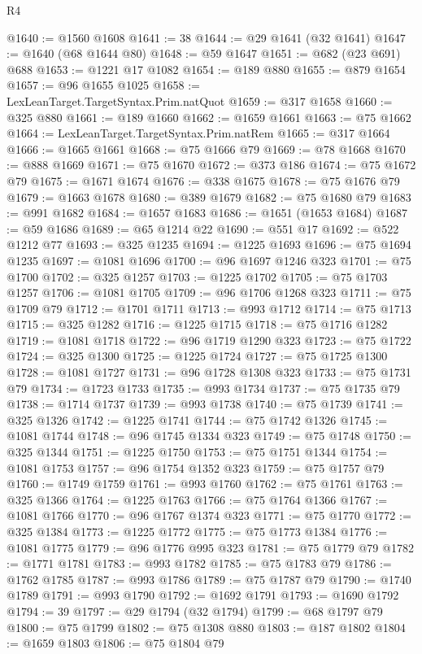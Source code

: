 \begin{lexlean}{R4}
\begin{coremodule}
@1640 := @1560 @1608
@1641 := 38
@1644 := @29 @1641 (@32 @1641)
@1647 := @1640 (@68 @1644 @80)
@1648 := @59 @1647
@1651 := @682 (@23 @691) @688
@1653 := @1221 @17 @1082
@1654 := @189 @880
@1655 := @879 @1654
@1657 := @96 @1655 @1025
@1658 := LexLeanTarget.TargetSyntax.Prim.natQuot
@1659 := @317 @1658
@1660 := @325 @880
@1661 := @189 @1660
@1662 := @1659 @1661
@1663 := @75 @1662
@1664 := LexLeanTarget.TargetSyntax.Prim.natRem
@1665 := @317 @1664
@1666 := @1665 @1661
@1668 := @75 @1666 @79
@1669 := @78 @1668
@1670 := @888 @1669
@1671 := @75 @1670
@1672 := @373 @186
@1674 := @75 @1672 @79
@1675 := @1671 @1674
@1676 := @338 @1675
@1678 := @75 @1676 @79
@1679 := @1663 @1678
@1680 := @389 @1679
@1682 := @75 @1680 @79
@1683 := @991 @1682
@1684 := @1657 @1683
@1686 := @1651 (@1653 @1684)
@1687 := @59 @1686
@1689 := @65 @1214 @22
@1690 := @551 @17
@1692 := @522 @1212 @77
@1693 := @325 @1235
@1694 := @1225 @1693
@1696 := @75 @1694 @1235
@1697 := @1081 @1696
@1700 := @96 @1697 @1246 @323
@1701 := @75 @1700
@1702 := @325 @1257
@1703 := @1225 @1702
@1705 := @75 @1703 @1257
@1706 := @1081 @1705
@1709 := @96 @1706 @1268 @323
@1711 := @75 @1709 @79
@1712 := @1701 @1711
@1713 := @993 @1712
@1714 := @75 @1713
@1715 := @325 @1282
@1716 := @1225 @1715
@1718 := @75 @1716 @1282
@1719 := @1081 @1718
@1722 := @96 @1719 @1290 @323
@1723 := @75 @1722
@1724 := @325 @1300
@1725 := @1225 @1724
@1727 := @75 @1725 @1300
@1728 := @1081 @1727
@1731 := @96 @1728 @1308 @323
@1733 := @75 @1731 @79
@1734 := @1723 @1733
@1735 := @993 @1734
@1737 := @75 @1735 @79
@1738 := @1714 @1737
@1739 := @993 @1738
@1740 := @75 @1739
@1741 := @325 @1326
@1742 := @1225 @1741
@1744 := @75 @1742 @1326
@1745 := @1081 @1744
@1748 := @96 @1745 @1334 @323
@1749 := @75 @1748
@1750 := @325 @1344
@1751 := @1225 @1750
@1753 := @75 @1751 @1344
@1754 := @1081 @1753
@1757 := @96 @1754 @1352 @323
@1759 := @75 @1757 @79
@1760 := @1749 @1759
@1761 := @993 @1760
@1762 := @75 @1761
@1763 := @325 @1366
@1764 := @1225 @1763
@1766 := @75 @1764 @1366
@1767 := @1081 @1766
@1770 := @96 @1767 @1374 @323
@1771 := @75 @1770
@1772 := @325 @1384
@1773 := @1225 @1772
@1775 := @75 @1773 @1384
@1776 := @1081 @1775
@1779 := @96 @1776 @995 @323
@1781 := @75 @1779 @79
@1782 := @1771 @1781
@1783 := @993 @1782
@1785 := @75 @1783 @79
@1786 := @1762 @1785
@1787 := @993 @1786
@1789 := @75 @1787 @79
@1790 := @1740 @1789
@1791 := @993 @1790
@1792 := @1692 @1791
@1793 := @1690 @1792
@1794 := 39
@1797 := @29 @1794 (@32 @1794)
@1799 := @68 @1797 @79
@1800 := @75 @1799
@1802 := @75 @1308 @880
@1803 := @187 @1802
@1804 := @1659 @1803
@1806 := @75 @1804 @79

\end{coremodule}
\end{lexlean}
